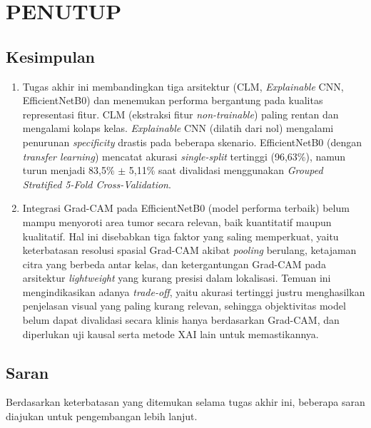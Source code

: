 \cleardoublepage
\chapter{PENUTUP}
\label{chap:penutup}
\section{Kesimpulan}
\begin{enumerate}
	\item Tugas akhir ini membandingkan tiga arsitektur (CLM, \textit{Explainable} CNN, EfficientNetB0) dan menemukan performa bergantung pada kualitas representasi fitur. CLM (ekstraksi fitur \textit{non-trainable}) paling rentan dan mengalami kolaps kelas. \textit{Explainable} CNN (dilatih dari nol) mengalami penurunan \textit{specificity} drastis pada beberapa skenario. EfficientNetB0 (dengan \textit{transfer learning}) mencatat akurasi \textit{single-split} tertinggi (96,63\%), namun turun menjadi 83,5\% $\pm$ 5,11\% saat divalidasi menggunakan \textit{Grouped Stratified 5-Fold Cross-Validation}.
	
	\item Integrasi Grad-CAM pada EfficientNetB0 (model performa terbaik) belum mampu menyoroti area tumor secara relevan, baik kuantitatif maupun kualitatif. Hal ini disebabkan tiga faktor yang saling memperkuat, yaitu keterbatasan resolusi spasial Grad-CAM akibat \textit{pooling} berulang, ketajaman citra yang berbeda antar kelas, dan ketergantungan Grad-CAM pada arsitektur \textit{lightweight} yang kurang presisi dalam lokalisasi. Temuan ini mengindikasikan adanya \textit{trade-off}, yaitu akurasi tertinggi justru menghasilkan penjelasan visual yang paling kurang relevan, sehingga objektivitas model belum dapat divalidasi secara klinis hanya berdasarkan Grad-CAM, dan diperlukan uji kausal serta metode XAI lain untuk memastikannya.
\end{enumerate}

\section{Saran}
Berdasarkan keterbatasan yang ditemukan selama tugas akhir ini, beberapa saran diajukan untuk pengembangan lebih lanjut.

